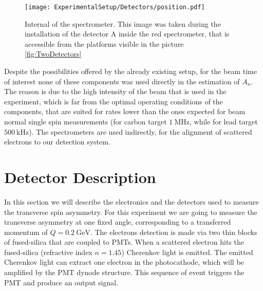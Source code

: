 \begin{figure}
\centering
\caption{Internal of the spectrometer. This image was taken during the installation of the detector A inside the red spectrometer, that is accessible from the platforms visible in the picture \ref{fig:TwoDetectors}}
\texttt{[image: ExperimentalSetup/Detectors/position.pdf]}
\label{fig:internal}
\end{figure} 

Despite the possibilities offered by the already existing setup, for the beam time of interest none of these components was used directly in the estimation of $A_{n}$. The reason is due to the high intensity of the beam that is used in the experiment, which is far from the optimal operating conditions of the components, that are suited for rates lower than the ones expected for beam normal single spin measurements (for carbon target $\SI{1}{\mega \hertz}$, while for lead target $\SI{500}{\kilo \hertz}$). The spectrometers are used indirectly, for the alignment of scattered electrons to our detection system.


\section{Detector Description} \label{detectors}
In this section we will describe the electronics and the detectors used to measure the transverse spin asymmetry.
For this experiment we are going to measure the transverse asymmetry at one fixed angle, corresponding to a transferred momentum of $Q = \SI{0.2}{\giga \electronvolt}$. The electrons detection is 
made via two thin blocks of fused-silica that are coupled to PMTs. When a scattered electron hits the fused-silica (refractive index $n = 1.45$) Cherenkov light is emitted. The emitted Cherenkov light can extract one electron in the photocathode, which will be amplified by the PMT dynode structure. This sequence of event triggers the PMT and produce an output signal.

